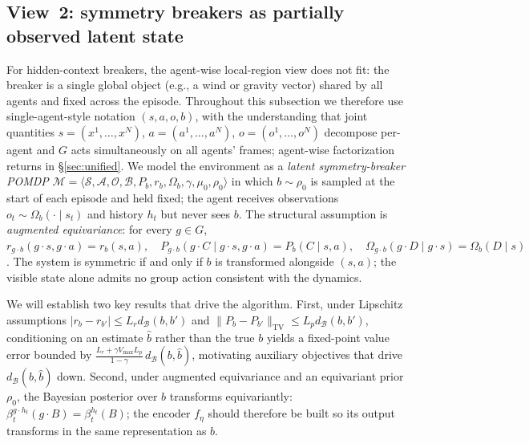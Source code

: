 \documentclass[11pt]{article}
\begin{document}
\subsection{View~2: symmetry breakers as partially observed latent state}
For hidden-context breakers, the agent-wise local-region view does not fit: the breaker is a single global object (e.g., a wind or gravity vector) shared by all agents and fixed across the episode. Throughout this subsection we therefore use single-agent-style notation $(s, a, o, b)$, with the understanding that joint quantities $s = (x^1,\dots,x^N)$, $a = (a^1,\dots,a^N)$, $o = (o^1,\dots,o^N)$ decompose per-agent and $G$ acts simultaneously on all agents' frames; agent-wise factorization returns in \S\ref{sec:unified}. We model the environment as a \emph{latent symmetry-breaker POMDP} $\mathcal{M} = \langle \mathcal{S}, \mathcal{A}, \mathcal{O}, \mathcal{B}, P_b, r_b, \Omega_b, \gamma, \mu_0, \rho_0\rangle$ in which $b \sim \rho_0$ is sampled at the start of each episode and held fixed; the agent receives observations $o_t \sim \Omega_b(\cdot \mid s_t)$ and history $h_t$ but never sees $b$.
The structural assumption is \emph{augmented equivariance}: for every $g \in G$,
$
r_{g\cdot b}(g \cdot s, g \cdot a) = r_b(s,a), \quad
P_{g\cdot b}(g \cdot C \mid g \cdot s, g \cdot a) = P_b(C \mid s,a), \quad
\Omega_{g\cdot b}(g \cdot D \mid g \cdot s) = \Omega_b(D \mid s)
$.
The system is symmetric if and only if $b$ is transformed alongside $(s,a)$; the visible state alone admits no group action consistent with the dynamics.

We will establish two key results that drive the algorithm. 
First, under Lipschitz assumptions $|r_b - r_{b'}| \le L_r d_\mathcal{B}(b, b')$ and $\|P_b - P_{b'}\|_{\text{TV}} \le L_p d_\mathcal{B}(b, b')$, conditioning on an estimate $\widehat{b}$ rather than the true $b$ yields a fixed-point value error bounded by $\tfrac{L_r + \gamma V_{\max} L_p}{1-\gamma}\,d_\mathcal{B}(b, \widehat{b})$, motivating auxiliary objectives that drive $d_\mathcal{B}(b, \widehat{b})$ down. 
Second, under augmented equivariance and an equivariant prior $\rho_0$, the Bayesian posterior over $b$ transforms equivariantly: $\beta^{g \cdot h_t}_t(g \cdot B) = \beta^{h_t}_t(B)$; the encoder $f_\eta$ should therefore be built so its output transforms in the same representation as $b$.
\end{document}
